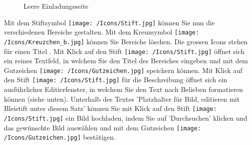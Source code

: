 \begin{figure}[H]
\caption{Leere Einladungsseite}
\end{figure}

Mit dem Stiftsymbol \texttt{[image: /Icons/Stift.jpg]} können Sie nun die verschiedenen Bereiche gestalten. Mit dem Kreuzsymbol \texttt{[image: /Icons/Kreuzchen\_b.jpg]} können Sie Bereiche löschen.
Die grossen Icons stehen für einen Titel . Mit Klick auf den Stift \texttt{[image: /Icons/Stift.jpg]} öffnet sich ein reines Textfeld, in welchem Sie den Titel des Bereiches eingeben und mit dem Gutzeichen \texttt{[image: /Icons/Gutzeichen.jpg]} speichern können.
Mit Klick auf den Stift \texttt{[image: /Icons/Stift.jpg]} für die Beschreibung  öffnet sich ein ausführliches Editierfenster, in welchem Sie den Text nach Belieben formatieren können (siehe unten). Unterhalb des Textes 'Platzhalter für Bild, editieren mit Bleistift unter diesem Satz' können Sie mit Klick auf den Stift \texttt{[image: /Icons/Stift.jpg]} ein Bild hochladen, indem Sie auf 'Durchsuchen' klicken und das gewünschte Bild auswählen und mit dem Gutzeichen \texttt{[image: /Icons/Gutzeichen.jpg]} bestätigen. 

